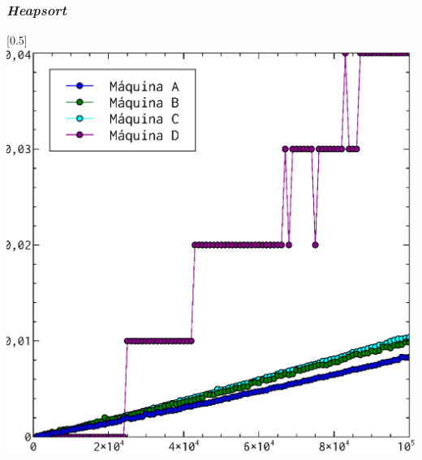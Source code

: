 \documentclass[compress]{beamer}
\begin{document}
\begin{frame}
\frametitle{\textit{Heapsort}}
	\begin{center}
\scalebox{0.53}[0.5]{
    \includegraphics[]{heapsort_todos.eps}
}
\end{center}
\end{frame}
\end{document}
